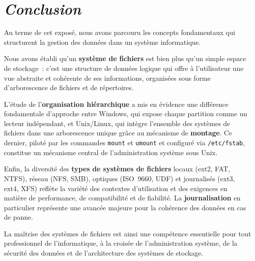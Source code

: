 \chapter*{\textit{Conclusion}}
Au terme de cet exposé, nous avons parcouru les concepts fondamentaux qui structurent la gestion des données dans un système informatique.

Nous avons établi qu'un \textbf{système de fichiers} est bien plus qu'un simple espace de stockage~: c'est une structure de données logique qui offre à l'utilisateur une vue abstraite et cohérente de ses informations, organisées sous forme d'arborescence de fichiers et de répertoires.

L'étude de l'\textbf{organisation hiérarchique} a mis en évidence une différence fondamentale d'approche entre Windows, qui expose chaque partition comme un lecteur indépendant, et Unix/Linux, qui intègre l'ensemble des systèmes de fichiers dans une arborescence unique grâce au mécanisme de \textbf{montage}. Ce dernier, piloté par les commandes \texttt{mount} et \texttt{umount} et configuré via \texttt{/etc/fstab}, constitue un mécanisme central de l'administration système sous Unix.

Enfin, la diversité des \textbf{types de systèmes de fichiers} locaux (ext2, FAT, NTFS), réseau (NFS, SMB), optiques (ISO~9660, UDF) et journalisés (ext3, ext4, XFS) reflète la variété des contextes d'utilisation et des exigences en matière de performance, de compatibilité et de fiabilité. La \textbf{journalisation} en particulier représente une avancée majeure pour la cohérence des données en cas de panne.

La maîtrise des systèmes de fichiers est ainsi une compétence essentielle pour tout professionnel de l'informatique, à la croisée de l'administration système, de la sécurité des données et de l'architecture des systèmes de stockage.